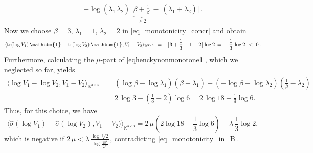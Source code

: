 \documentclass[10pt]{article}
\numberwithin{theoremCounter}{section}
\theoremstyle{plain}
\theoremstyle{definition}
\newcommand{\id}{{\boldsymbol{\mathbbm{1}}}}
\newcommand{\innerproduct}[1]{\langle #1 \rangle}
\newcommand{\iprod}{\innerproduct}
\DeclareMathOperator{\tr}{tr}
\def\tr{\textnormal{tr}}
\numberwithin{equation}{section}
\begin{document}
\begin{appendix}
\begin{equation}
\begin{alignedat}{2}
	\quad =\ &-\log(\overline\lambda_1\,\overline\lambda_2)\,\bigl[\underbrace{\beta+\frac 1\beta}_{\geq 2}\ -\ (\overline\lambda_1+\overline\lambda_2)\bigr]\,.
	\end{alignedat}
	\end{equation}
Now we choose $\beta=3$, $\overline\lambda_1=1$, $\overline\lambda_2=2$ in \eqref{eq_monotonicity_concr} and obtain
	\begin{equation}
	\iprod{\tr(\log V_1)\,\id - \tr(\log V_2)\,\id, V_1-V_2}_{\mathbb{R}^{3\times 3}}\ =- \bigl[3+\frac 13 - 1 - 2\bigr]\log 2\, =\ -\frac 13\,\log 2\ <\ 0\,.
	\end{equation}
Furthermore, calculating the $\mu$-part of \eqref{eqhenckynonmonotone1}, which we neglected so far, yields
	\begin{equation}
	\begin{alignedat}{2}
	\langle \log V_1 - \log V_2, V_1-V_2\rangle_{\mathbb{R}^{3\times 3}}&=(\log \beta-\log \overline{\lambda}_1)(\beta- \overline{\lambda}_1)+(-\log \beta-\log \overline{\lambda}_2) \left(\frac{1}{\beta}- \overline{\lambda}_2\right) \\
	&=2\,\log 3-\left(\frac{1}{3}-2\right)\log 6=2\,\log 18-\frac{1}{3}\log 6.
	\end{alignedat}
	\end{equation}
Thus, for this choice, we have
	\begin{equation}
	\iprod{\widehat \sigma(\log V_1)-\widehat \sigma(\log V_2),V_1-V_2)}_{\mathbb{R}^{3\times 3}}=2 \, \mu \left(2\log 18-\frac{1}{3}\log 6\right)-\lambda\,\frac{1}{3}\log 2,
	\end{equation}
which is negative if $2\, \mu<\lambda\, \frac{\log \sqrt[3]{2}}{\log \frac{18^2}{\sqrt[3]{6}}}$, contradicting \eqref{eq_monotonicity_in_B}.
%

\end{appendix}
\end{document}
